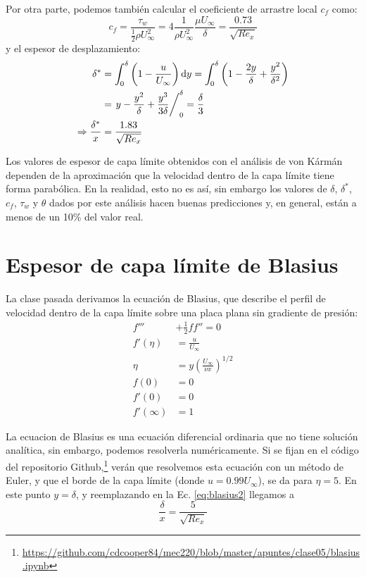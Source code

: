Por otra parte, podemos también calcular el coeficiente de arrastre local $c_f$ como:
%
\begin{equation}\label{eq:cf_vk}
c_f = \frac{\tau_w}{\frac{1}{2}\rho U_\infty^2} = 4\frac{1}{\rho U_\infty^2}\frac{\mu U_\infty}{\delta} = \frac{0.73}{\sqrt{Re_x}}
\end{equation}
%
y el espesor de desplazamiento:
%
\begin{align}\label{eq:desplazamiento_vk}
\delta^* &= \int_0^\delta\left(1-\frac{u}{U_\infty}\right)\mathrm{d}y = \int_0^\delta \left(1-\frac{2y}{\delta}+\frac{y^2}{\delta^2}\right)\nonumber\\
&= \left. y-\frac{y^2}{\delta}+\frac{y^3}{3\delta}\right/_0^\delta = \frac{\delta}{3}\nonumber\\
\Rightarrow \frac{\delta^*}{x} &= \frac{1.83}{\sqrt{Re_x}}
\end{align}

Los valores de espesor de capa límite obtenidos con el análisis de von Kármán dependen de la aproximación que la velocidad dentro de la capa límite tiene forma parabólica. 
En la realidad, esto no es así, sin embargo los valores de $\delta$, $\delta^*$, $c_f$, $\tau_w$ y $\theta$ dados por este análisis hacen buenas predicciones y, en general, están a menos de un 10\% del valor real.

\section*{Espesor de capa límite de Blasius}

 La clase pasada derivamos la ecuación de Blasius, que describe el perfil de velocidad dentro de la capa límite sobre una placa plana sin gradiente de presión:
 \begin{align}\label{eq:blasius2}
f'''&+\frac{1}{2}ff''=0\nonumber\\
f'(\eta) &= \frac{u}{U_\infty} \nonumber\\
\eta &= y\left(\frac{U_\infty}{\nu x}\right)^{1/2}\nonumber\\
f(0) &= 0\nonumber\\
f'(0) &= 0\nonumber\\
f'(\infty) &= 1
 \end{align}

 La ecuacion de Blasius es una ecuación diferencial ordinaria que no tiene solución analítica, sin embargo, podemos resolverla numéricamente.
 Si se fijan en el código del repositorio Github,\footnote{\url{https://github.com/cdcooper84/mec220/blob/master/apuntes/clase05/blasius.ipynb}} verán  que resolvemos esta ecuación con un método de Euler, y que el borde de la capa límite (donde $u=0.99U_\infty$), se da para $\eta=5$.
En este punto $y=\delta$, y reemplazando en la Ec. \eqref{eq:blasius2} llegamos a
%
\begin{equation}\label{eq:delta_blasius}
\frac{\delta}{x} = \frac{5}{\sqrt{Re_x}}
\end{equation}

